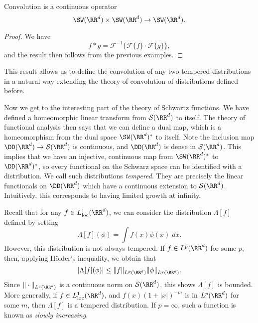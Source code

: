 \begin{corollary}
    Convolution is a continuous operator
    \[ \SW(\RR^d) \times \SW(\RR^d) \to \SW(\RR^d). \]
\end{corollary}
\begin{proof}
    We have
    \[ f * g = \mathcal{F}^{-1} \{ \mathcal{F} \{ f \} \cdot \mathcal{F} \{ g \} \}, \]
    and the result then follows from the previous examples.
\end{proof}

\begin{remark}
    This result allows us to define the convolution of any two tempered distributions in a natural way extending the theory of convolution of distributions defined before.
\end{remark}

Now we get to the interesting part of the theory of Schwartz functions. We have defined a homeomorphic linear transform from $\mathcal{S}(\RR^d)$ to itself. The theory of functional analysis then says that we can define a dual map, which is a homeomorphism from the dual space $\SW(\RR^d)^*$ to itself. Note the inclusion map $\DD(\RR^d) \to \mathcal{S}(\RR^d)$ is continuous, and $\DD(\RR^d)$ is dense in $\mathcal{S}(\RR^d)$. This implies that we have an injective, continuous map from $\SW(\RR^d)^*$ to $\DD(\RR^d)^*$, so every functional on the Schwarz space can be identified with a distribution. We call such distributions \emph{tempered}. They are precisely the linear functionals on $\DD(\RR^d)$ which have a continuous extension to $\mathcal{S}(\RR^d)$. Intuitively, this corresponds to having limited growth at infinity.

\begin{example}
    Recall that for any $f \in L^1_{\text{loc}}(\RR^d)$, we can consider the distribution $\Lambda[f]$ defined by setting
    \[ \Lambda[f](\phi) = \int f(x) \phi(x)\; dx. \]
    However, this distribution is not always tempered. If $f \in L^p(\RR^d)$ for some $p$, then, applying H\"{o}lder's inequality, we obtain that
    \[ |\Lambda[f](\phi)| \leq \| f \|_{L^p(\RR^d)} \| \phi \|_{L^q(\RR^d)}. \]
    Since $\| \cdot \|_{L^q(\RR^d)}$ is a continuous norm on $\mathcal{S}(\RR^d)$, this shows $\Lambda[f]$ is bounded. More generally, if $f \in L^1_{\text{loc}}(\RR^d)$, and $f(x) (1 + |x|)^{-m}$ is in $L^p(\RR^d)$ for some $m$, then $\Lambda[f]$ is a tempered distribution. If $p = \infty$, such a function is known as \emph{slowly increasing}.
\end{example}

